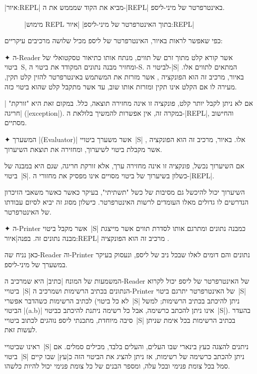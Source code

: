 |איור:REPL| מביא את הקוד שמממש את ה-\E|REPL| באינטרפרטר של מיני-ליספ.
\begin{figure}[H]
|מימוש REPL בתוך האינטרפרטר של מיני-ליספ|
|איור:REPL|

\end{figure}

כפי שאפשר לראות באיור, האינטרפרטר של ליספ מכיל שלושה מרכיבים עיקריים:
\begin{enumerate}

  ✦ ה-Reader אשר קורא קלט מתוך זרם של תווים, מנתח אותו כתיאור טסקטואלי של
  ביטוי~S, ומחזיר מבנה נתונים המקודד את ביטוי ה-S. לביטוי ה-\E|S|
  המתאים
  לתווים אלו. באיור, מרכיב זה הוא הפונקציה ,
  אשר מזרזת את המשתמש באינטרפרטר להזין קלט תקין, מעירה לו אם הקלט אינו תקין
  ומזרזת אותו שוב, עד אשר מתקבל קלט שהוא ביטוי כזה.

  אם לא ניתן לקבל יותר קלט, פונקציה זו אינה מחזירה תוצאה, כלל. במקום זאת היא
  "זורקת" \ע|חריגה| (\E|exception|). במקרה זה, אין אפשרות להמשיך בלולאת
  ה-\E|REPL|, והחישוב מסתיים.

  ✦ המשערך \E|(Evaluator)| אשר משערך ביטויי~\E|S| אלו. באיור, מרכיב זה הוא
  הפונקציה , אשר מקבלת ביטוי לשיערוך, ומחזירה את תוצאת השיערוך.

  אם השיערוך נכשל, פונקציה זו אינה מחזירה ערך, אלא זורקת חריגה, שגם היא במבנה
  של ביטוי~\E|S|. כשלון בשיערוך של ביטוי מסויים אינו מפסיק את מחזורי
  ה-\E|REPL|.

  השיערוך יכול להיכשל גם מסיבות של כשל "תשתיתי", בעיקר כאשר כאשר משאבי הזיכרון
  הנדרשים לו גדולים מאלו העומדים לרשות האינטרפרטר. כישלון מסוג זה יביא לסיום עבודתו
  של האינטרפרטר.

  ✦ ה-Printer אשר מקבל ביטוי~\E|S| כמבנה נתונים ומתרגם אותו לסדרת תווים אשר
  מייצגת מבנה נתונים זה. בפנה|איור:REPL| מרכיב זה הוא הפונקציה .
\end{enumerate}

כאן נניח שה-Reader וה-Printer נתונים והם דומים לאלו שבכל ניב של ליספ, ונעסוק
בעיקר במשערך של מיני-ליספ.

המשמעות של המונח \ע|כתיב| היא שמרכיב ה-Reader של האינטרפרטר של ליספ יכול לקרוא
ביטויי~\E|S| הנתונים בכתיב הרשימות ושמרכיב ה-Printer של האינטרפרטר יתרגם
ביטוי~\E|S| לכתיב הרשימות כשהדבר אפשרי (לא כל ביטוי~\E|S| ניתן להיכתב בכתיב
הרשימות; למשל הביטוי \E|(a.b)| אינו ניתן להכתב כרשימה, אבל כל רשימה ניתנת
להיכתב כביטוי~\E|S|). בהעדר סיבה מיוחדת, מתכנתי ליספ נוהגים לכתוב ביטויי~\E|S|
בכתיב הרשימות בכל אימת שניתן לעשות זאת.

ראינו שביטויי~\E|S| ניתנים להצגה כעץ בינארי שבו העלים, והעלים בלבד, מכילים
סמלים. אם ביטוי~\E|S| ניתן להכתב כרשימה של רשימות, אז ניתן להציג את הביטוי
הזה כ\ע|עץ| שבו קיים סמל בכל צומת פנימי ובכל עלה, ומספר הבנים של כל צומת פנימי
יכול להיות כלשהו.
